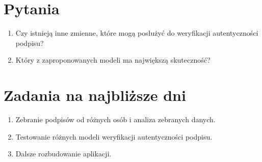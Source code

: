 \documentclass{mwrep}
\begin{document}
{\let\clearpage\relax \chapter{Pytania}}
\begin{enumerate}
    \item Czy istnieją inne zmienne, które mogą posłużyć do weryfikacji autentyczności podpisu?
    \item Który z zaproponowanych modeli ma największą skuteczność?
\end{enumerate}

{\let\clearpage\relax \chapter{Zadania na najbliższe dni}}
\begin{enumerate}
    \item Zebranie podpisów od różnych osób i analiza zebranych danych.
    \item Testowanie różnych modeli weryfikacji autentyczności podpisu.
    \item Dalsze rozbudowanie aplikacji.
\end{enumerate}
\end{document}
